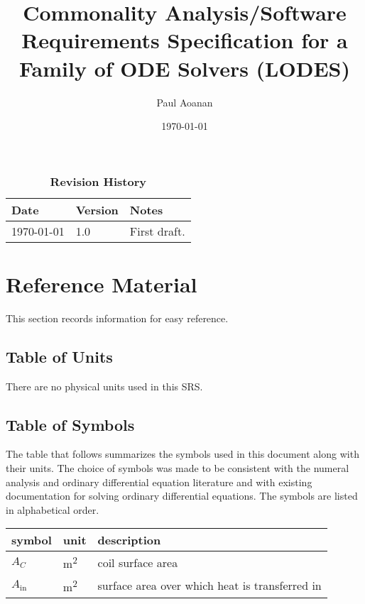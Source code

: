 \documentclass[12pt]{article}
\newcommand{\progname}{LODES} %
\newcommand{\progdesc}{Family of ODE Solvers}
\begin{document}
\title{Commonality Analysis/Software Requirements Specification for a \progdesc{} (\progname{})} 
\author{Paul Aoanan}
\date{\today}
	
\maketitle

\tableofcontents

\begin{table}[bp]
\caption{\bf Revision History}
\begin{tabularx}{\textwidth}{p{3cm}p{2cm}X}
\toprule {\bf Date} & {\bf Version} & {\bf Notes}\\
\midrule
\today & 1.0 & First draft.\\
\bottomrule
\end{tabularx}
\end{table}

\section{Reference Material}

This section records information for easy reference.

\subsection{Table of Units}

There are no physical units used in this SRS.

\subsection{Table of Symbols}

The table that follows summarizes the symbols used in this document along with
their units.  The choice of symbols was made to be consistent with the numeral analysis
and ordinary differential equation literature and with existing documentation
for solving ordinary differential equations.  The symbols are listed in alphabetical order.

\renewcommand{\arraystretch}{1.2}
\noindent \begin{longtable*}{l l p{12cm}} \toprule
\textbf{symbol} & \textbf{unit} & \textbf{description}\\
\midrule 
$A_C$ & \si[per-mode=symbol] {\square\metre} & coil surface area
\\
$A_\text{in}$ & \si[per-mode=symbol] {\square\metre} & surface area over 
which heat is transferred in
\\ 
\bottomrule
\end{longtable*}
\end{document}
